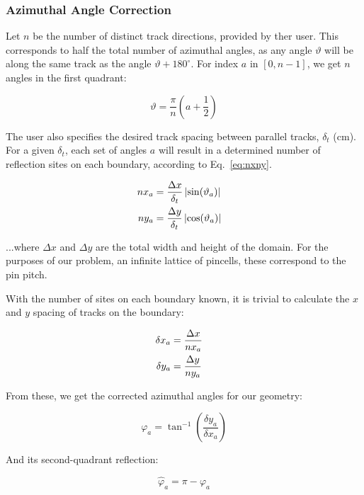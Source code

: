 \documentclass[12pt]{article}
\begin{document}
\subsubsection{Azimuthal Angle Correction}\label{sec:trackgeneratorangles}

Let $n$ be the number of distinct track directions, provided by ther user. This corresponds to half the total number of azimuthal angles, as any angle $\vartheta $ will be along the same track as the angle $\vartheta + 180^\circ$. For index $a$ in $\left[0, n-1\right]$, we get $n$ angles in the first quadrant:

\begin{equation}\label{eq:targetn}
\vartheta = \frac{\pi}{n} \left( a + \frac{1}{2} \right)
\end{equation}

The user also specifies the desired track spacing between parallel tracks, $\delta_t$ (cm). For a given $\delta_t$, each set of angles $a$ will result in a determined number of reflection sites on each boundary, according to Eq.~\ref{eq:nxny}.

\begin{align}\label{eq:nxny}
nx_a &= \frac{\Delta x}{\delta_t} \left| \sin(\vartheta _a) \right|
\cr
ny_a &= \frac{\Delta y}{\delta_t} \left| \cos(\vartheta _a) \right|
\end{align}

...where $\Delta x$ and $\Delta y$ are the total width and height of the domain. For the purposes of our problem, an infinite lattice of pincells, these correspond to the pin pitch.

With the number of sites on each boundary known, it is trivial to calculate the $x$ and $y$ spacing of tracks on the boundary:

\begin{align}\label{eq:delxdely}
\delta x_a &= \frac{\Delta x}{nx_a}
\cr
\delta y_a &= \frac{\Delta y}{ny_a}
\end{align}

From these, we get the corrected azimuthal angles for our geometry:

\begin{equation}\label{eq:varphi}
\varphi_a = \tan^{-1}\left( \frac{\delta y_a}{\delta x_a} \right)
\end{equation}

And its second-quadrant reflection:

\begin{equation}\label{eq:ihprav}
\hat{\varphi}_a = \pi - \varphi_a
\end{equation}
\end{document}
